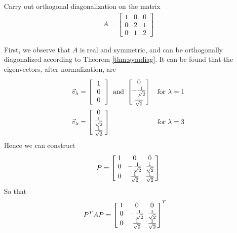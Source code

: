 \begin{exmp}
\label{exmp:orthodiag}
Carry out orthogonal diagonalization on the matrix
\begin{align*}
A =
\begin{bmatrix}
1 & 0 & 0 \\
0 & 2 & 1 \\
0 & 1 & 2
\end{bmatrix}
\end{align*}
\end{exmp}
\begin{solution}
First, we observe that $A$ is real and symmetric, and can be orthogonally diagonalized according to Theorem \ref{thm:symdiag}. It can be found that the eigenvectors, after normalization, are
\begin{align*}
&\vec{v}_\lambda = 
\left[
\begin{array}{wc{8pt}}
1 \\
0 \\
0
\end{array}\right] \text{ and }
\left[\begin{array}{wc{10pt}}
0 \\
-\frac{1}{\sqrt{2}} \\
\frac{1}{\sqrt{2}}
\end{array}\right]
& \text{for } \lambda = 1 \\
&\vec{v}_\lambda = 
\left[\begin{array}{wc{8pt}}
0 \\
\frac{1}{\sqrt{2}} \\
\frac{1}{\sqrt{2}}
\end{array}\right]
& \text{for } \lambda = 3
\end{align*}
Hence we can construct
\begin{align*}
P =
\left[\begin{array}{@{}wc{12pt}wc{12pt}wc{12pt}@{\,}}
1 & 0 & 0 \\
0 & -\frac{1}{\sqrt{2}} & \frac{1}{\sqrt{2}} \\
0 & \frac{1}{\sqrt{2}} & \frac{1}{\sqrt{2}}
\end{array}\right]
\end{align*}
So that
\begin{align*}
P^TAP &=
\left[\begin{array}{@{}wc{12pt}wc{12pt}wc{12pt}@{\,}}
1 & 0 & 0 \\
0 & -\frac{1}{\sqrt{2}} & \frac{1}{\sqrt{2}} \\
0 & \frac{1}{\sqrt{2}} & \frac{1}{\sqrt{2}}
\end{array}\right]^T

\end{align*}
\end{solution}
